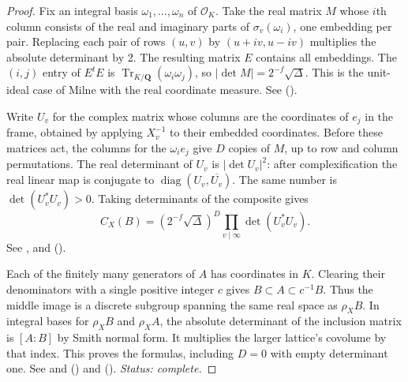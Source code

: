 \begin{proof}
Fix an integral basis $\omega_1,\ldots,\omega_n$ of $\mathcal O_K$.
Take the real matrix $M$ whose $i$th column consists of the real and
imaginary parts of $\sigma_v(\omega_i)$, one embedding per pair.
Replacing each pair of rows $(u,v)$ by $(u+iv,u-iv)$ multiplies the
absolute determinant by 2. The resulting matrix $E$ contains all
embeddings. The $(i,j)$ entry of $E^{t}E$ is
$\operatorname{Tr}_{K/\mathbf Q}(\omega_i\omega_j)$, so
$|\det M|=2^{-f}\sqrt{\Delta}$. This is the unit-ideal case of
Milne \cite[Prop.~4.25]{P-Milne-Cheb} with the real coordinate measure.
See  ().

Write $U_v$ for the complex matrix whose columns are the coordinates
of $e_j$ in the frame, obtained by applying $X_v^{-1}$ to their
embedded coordinates. Before these matrices act, the columns for
the $\omega_i e_j$ give $D$ copies of $M$, up to row and column
permutations. The real determinant of $U_v$ is $|\det U_v|^2$:
after complexification the real linear map is conjugate to
$\operatorname{diag}(U_v,\overline{U_v})$. The same number is
$\det(U_v^*U_v)>0$. Taking determinants of the composite gives
\[
 C_X(B)=(2^{-f}\sqrt{\Delta})^D
           \prod_{v\mid\infty}\det(U_v^*U_v).
\]
See ,  and
 ().

Each of the finitely many generators of $A$ has coordinates in $K$.
Clearing their denominators with a single positive integer $c$ gives
$B\subset A\subset c^{-1}B$. Thus the middle image is a discrete
subgroup spanning the same real space as $\rho_X B$. In integral
bases for $\rho_X B$ and $\rho_X A$, the absolute determinant of the
inclusion matrix is $[A:B]$ by Smith normal form. It multiplies the
larger lattice's covolume by that index. This proves the formulas,
including $D=0$ with empty determinant one.
See  and 
() and
 ().
\emph{Status: complete.}
\end{proof}

